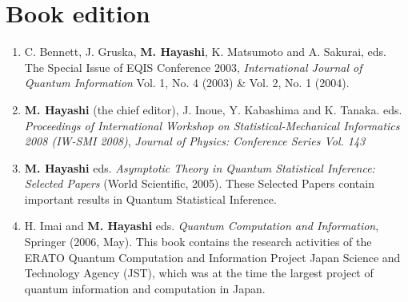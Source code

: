 \documentclass[a4paper,12pt,oneside]{article}
\begin{document}
\section{Book edition}
\begin{enumerate}
\item
C. Bennett, J. Gruska, \textbf{M. Hayashi}, K. Matsumoto and A. Sakurai, eds.
The Special Issue of EQIS Conference 2003, 
{\em International Journal of Quantum Information} 
Vol. 1, No. 4 (2003) \& Vol. 2, No. 1 (2004).

\item
\textbf{M. Hayashi} (the chief editor), J. Inoue, Y. Kabashima and K. Tanaka.
eds.
{\em Proceedings of International Workshop on Statistical-Mechanical Informatics 2008 (IW-SMI 2008)},
{\em Journal of Physics: Conference Series Vol. 143} 

\item
\textbf{M. Hayashi} eds.
{\em Asymptotic Theory in Quantum Statistical Inference: Selected Papers} (World Scientific, 2005).
These Selected Papers contain important results in Quantum Statistical Inference.

\item
H. Imai and \textbf{M. Hayashi} eds.
{\em Quantum Computation and Information}, Springer (2006, May).
This book contains the research activities of
the ERATO Quantum Computation and Information Project 
Japan Science and Technology Agency (JST), which was at the time the largest project of quantum information and computation in Japan.%
\end{enumerate}


\end{document}
